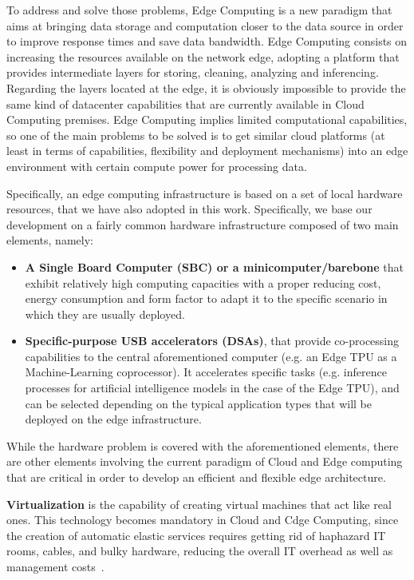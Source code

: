 To address and solve those problems, Edge Computing is a new paradigm that aims at bringing data storage and computation closer to the data source in order to improve response times and save data bandwidth. Edge Computing consists on increasing the resources available on the network edge, adopting a platform that provides intermediate layers for storing, cleaning, analyzing and inferencing.
%
Regarding the layers located at the edge, it is obviously impossible to provide the same kind of datacenter capabilities that are currently available in Cloud Computing premises. Edge Computing implies limited computational capabilities, so one of the main problems to be solved is to get similar cloud platforms (at least in terms of capabilities, flexibility and deployment mechanisms) into an edge environment with certain compute power for processing data.

Specifically, an edge computing infrastructure is based on a set of local hardware resources, that we have also adopted in this work. Specifically, we base our development on a fairly common hardware infrastructure composed of two main elements, namely:

\begin{itemize}
  \item \textbf{A Single Board Computer (SBC) or a minicomputer/barebone} that exhibit relatively high computing capacities with a proper reducing cost, energy consumption and form factor to adapt it to the specific scenario in which they are usually deployed.
  \item \textbf{Specific-purpose USB accelerators (DSAs)}, that provide co-processing capabilities to the central aforementioned computer (e.g. an Edge TPU as a Machine-Learning coprocessor). It accelerates specific tasks (e.g. inference processes for artificial intelligence models in the case of the Edge TPU), and can be selected depending on the typical application types that will be deployed on the edge infrastructure.
\end{itemize}

While the hardware problem is covered with the aforementioned elements, 
there are other elements involving the current paradigm of Cloud and Edge computing that are critical in order to develop an efficient and flexible edge architecture. 

\textbf{Virtualization} is the capability of creating virtual machines that act like real ones. This technology becomes mandatory in Cloud and Cdge Computing, since the creation of automatic elastic services requires getting rid of haphazard IT rooms, cables, and bulky hardware, reducing the overall IT overhead as well as management costs~\cite{virt_def}.

